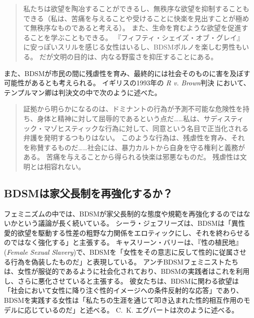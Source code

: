 \documentclass[paper=a4,book,openany]{jlreq}
\newcommand{\ig}[1]{}           %
\begin{document}
\begin{quote}
  私たちは欲望を陶冶することができるし、無秩序な欲望を抑制することもできる（私は、苦痛を与えることや受けることに快楽を見出すことが極めて無秩序なものであると考える）。
また、生命を育むような欲望を促進することを学ぶこともできる。
『フィフティ・シェイズ・オブ・グレイ』に安っぽいスリルを感じる女性はいるし、BDSMポルノを楽しむ男性もいる。
だが文明の目的は、内なる野蛮さを抑圧することにある。
\citep{dreher12:_million_shades_of_gross}
\end{quote}

また、BDSMが市民の間に残虐性を育み、最終的には社会そのものに害を及ぼす可能性があるとも考えられる。
イギリスの1993年の \emph{R v. Brown}判決 において、テンプルマン卿は判決文の中で次のように述べた。

\begin{quote}
証拠から明らかになるのは、ドミナントの行為が予測不可能な危険性を持ち、身体と精神に対して屈辱的であるという点だ……私は、サディスティック・マゾヒスティックな行為に対して、同意という名目で正当化される弁護を発明するつもりはない。
このような行為は、残虐性を育み、それを称賛するものだ……社会には、暴力カルトから自身を守る権利と義務がある。
苦痛を与えることから得られる快楽は邪悪なものだ。
残虐性は文明とは相容れない。
\ig{(\emph{R v. Brown})}
\end{quote}

\subsection{BDSMは家父長制を再強化するか？}

フェミニズムの中では、BDSMが家父長制的な態度や規範を再強化するのではないかという議論が長く続いている。
シーラ・ジェフリーズは、BDSMは「異性愛的欲望を駆動する性差の粗野な力関係をエロティックにし、それを終わらせるのではなく強化する」と主張する\citep[p.86]{jeffreys96:_heter_desir_gender}。
キャスリーン・バリー\ig{Barry}は、『性の植民地』(\emph{Female Sexual Slavery})で、BDSMを「女性をその意志に反して性的に従属させる行為を偽装したものだ」と表現している\citep[p.209]{barry79:_femal_sexual_slaver}。
アンチBDSMフェミニストたちは、女性が服従的であるように社会化されており、BDSMの実践者はこれを利用し、さらに悪化させていると主張する。
彼女たちは、BDSMに関わる欲望は「社会において女性に降り注ぐ性的イメージへの条件反射的な応答」であり、BDSMを実践する女性は「私たちの生涯を通じて叩き込まれた性的相互作用のモデルに応じているのだ」と述べる\citep[p.139]{nichols82:_is_sadom_femin}。
C.~K. エグバートは次のように述べる。
\end{document}
